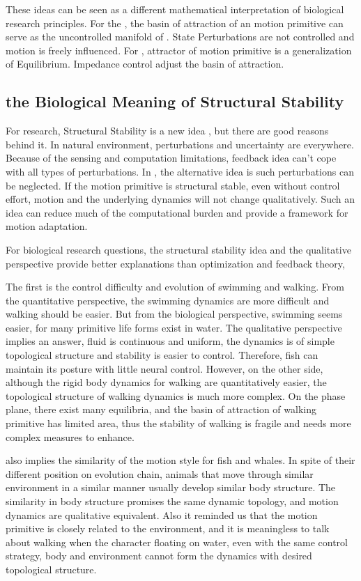 These ideas can be seen as a different mathematical interpretation of biological research principles.
For the  \umh,  the basin of attraction of an motion primitive can serve as the uncontrolled manifold of \umh.
State Perturbations are not controlled and motion is freely influenced.
For \eph, attractor of motion primitive is a generalization of Equilibrium.
Impedance control adjust the basin of attraction.





\subsection{the Biological Meaning of Structural Stability}
For \cms research, Structural Stability is a new idea , but there are good reasons behind it. 
In natural environment, perturbations and uncertainty are everywhere. 
Because of the sensing and computation limitations,  feedback idea  can't cope with all types of perturbations.
In \moit, the alternative idea is such perturbations can be neglected.
If the motion primitive is structural stable, even without control effort, motion and the underlying dynamics will not change qualitatively.
Such an idea can reduce much of the computational burden and provide a framework for motion adaptation.


For biological research questions, the structural stability idea and the qualitative perspective provide better explanations than optimization and feedback theory,

The first is the control difficulty and  evolution of swimming and walking.
From the quantitative perspective, the swimming dynamics are more difficult and walking should be easier.
But from the biological perspective, swimming seems easier, for many primitive life forms exist in water.
The qualitative perspective implies an answer, fluid is continuous and uniform, the dynamics is of simple topological structure and stability is easier to control.
Therefore, fish can maintain its posture with little neural control.
However, on the other side, although the rigid body dynamics for walking are quantitatively easier, the topological structure of walking dynamics is much more complex. 
On the phase plane, there exist many equilibria, and the basin of attraction of walking primitive has limited area,
thus the  stability of walking is fragile and needs more complex measures to enhance.

\moit also implies the similarity of the motion style for fish and whales.
In spite of their different position on evolution chain, animals that move through similar environment in a similar manner usually develop similar body structure.
The similarity in body structure promises the same dynamic topology, and motion dynamics are qualitative equivalent.
Also it reminded us that the motion primitive is closely related to the environment, and it is meaningless to talk about walking when the character floating on water, even with the same control strategy, body and environment cannot form the dynamics with desired topological structure.



